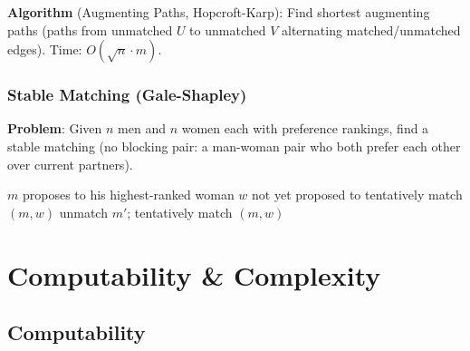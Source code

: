 \documentclass[oneside]{book}
\begin{document}
\textbf{Algorithm} (Augmenting Paths, Hopcroft-Karp): Find shortest augmenting
paths (paths from unmatched $U$ to unmatched $V$ alternating matched/unmatched edges).
Time: $O(\sqrt{n} \cdot m)$.

\subsection*{Stable Matching (Gale-Shapley)}

\textbf{Problem}: Given $n$ men and $n$ women each with preference rankings,
find a stable matching (no blocking pair: a man-woman pair who both prefer each other
over current partners).

\begin{algorithm}[H]
\caption{Gale-Shapley (Propose-and-Reject)}
\begin{algorithmic}[1]
    \State $m$ proposes to his highest-ranked woman $w$ not yet proposed to
        \State tentatively match $(m, w)$
        \State unmatch $m'$; tentatively match $(m, w)$
    \EndIf
\EndWhile
\end{algorithmic}
\end{algorithm}


\chapter{Computability \& Complexity}

\section{Computability}

\end{document}
